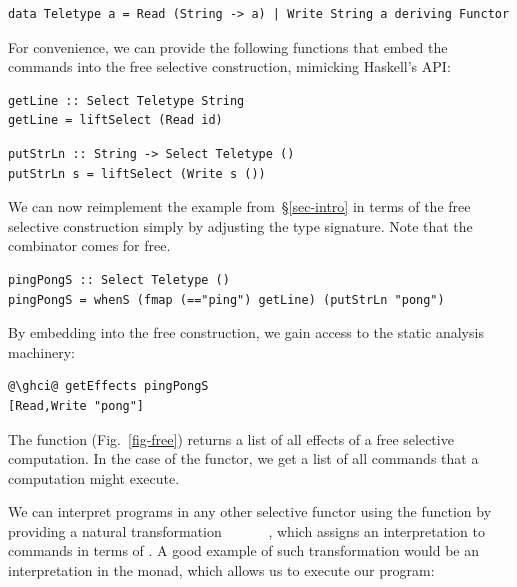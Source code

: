 \vspace{1mm}
\begin{verbatim}
data Teletype a = Read (String -> a) | Write String a deriving Functor
\end{verbatim}
\vspace{1mm}

\noindent
For convenience, we can provide the following functions that embed the commands
into the free selective construction, mimicking Haskell's  API:

\vspace{1mm}
\begin{verbatim}
getLine :: Select Teletype String
getLine = liftSelect (Read id)
\end{verbatim}
\vspace{0mm}
\begin{verbatim}
putStrLn :: String -> Select Teletype ()
putStrLn s = liftSelect (Write s ())
\end{verbatim}
\vspace{1mm}

\noindent
We can now reimplement the  example from~\S\ref{sec-intro} in
terms of the free selective construction simply by adjusting the type signature.
Note that the  combinator comes for free.

\vspace{1mm}
\begin{verbatim}
pingPongS :: Select Teletype ()
pingPongS = whenS (fmap (=="ping") getLine) (putStrLn "pong")
\end{verbatim}
\vspace{1mm}

\noindent
By embedding  into the free construction, we gain access to the
static analysis machinery:

\vspace{1mm}
\begin{verbatim}
@\ghci@ getEffects pingPongS
[Read,Write "pong"]
\end{verbatim}
\vspace{1mm}

\noindent
The  function (Fig.~\ref{fig-free}) returns a list of all effects
of a free selective computation. In the case of the  functor, we
get a list of all commands that a computation might execute.

We can interpret  programs in any other selective functor using
the  function by providing a natural transformation
~~~~\hs{->}~~, which assigns an
interpretation to  commands in terms of . A good example of
such transformation would be an interpretation in the  monad, which
allows us to execute our  program:

